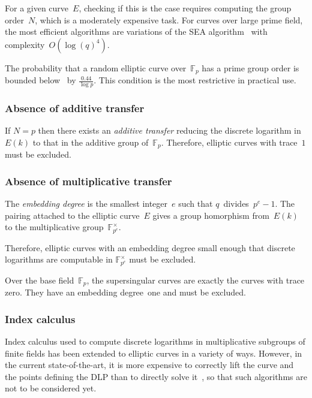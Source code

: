 \documentclass[twocolumn,letterpaper]{article}
\def\F{\mathbb{F}}
\begin{document}
For a given curve~$E$, checking if this is the case
requires computing the group order~$N$,
which is a moderately expensive task.
For curves over large prime field, the most efficient algorithms are variations
of the SEA algorithm~\cite{mathcomp1985schoof,
jtnb1995schoof,smf2008cl} with complexity~$O(\log(q)^4)$.

The probability that a random elliptic curve over~$\F_p$
has a prime group order is bounded below~\cite{lms2000gm}
by $\frac{0.44}{\log p}$.
This condition is the most restrictive in practical use.

\subsubsection{Absence of additive transfer}

If $N = p$ then there exists an \emph{additive transfer}
reducing the discrete logarithm in~$E(k)$
to that in the additive group of~$\F_p$.
Therefore, elliptic curves with trace~$1$ must be excluded.

\subsubsection{Absence of multiplicative transfer}
\label{sss:embedding-degree}

The \emph{embedding degree} is the smallest integer~$e$ such that
$q$~divides~$p^e -1$.
The pairing attached to the elliptic curve~$E$
gives a group homorphism from~$E(k)$
to the multiplicative group~$\F_{p^e}^{×}$.

Therefore, elliptic curves with an embedding degree small enough
that discrete logarithms are computable in $\F_{p^e}^{×}$
must be excluded.

Over the base field~$\F_p$, the supersingular curves
are exactly the curves with trace zero.
They have an embedding degree~one and must be excluded.

\subsubsection{Index calculus}

Index calculus used to compute discrete logarithms in multiplicative subgroups
of finite fields has been extended to elliptic curves in a variety of ways.
However, in the current state-of-the-art, it is more expensive
to correctly lift the curve and the points defining the DLP than
to directly solve it~\cite{asia1998ss,dcc2000silverman,dcc2000ksst,ecc2007silverman,sac2008silverman},
so that such algorithms are not to be considered yet.
\end{document}
